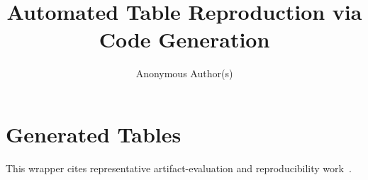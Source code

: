 \documentclass[sigconf,review,anonymous]{acmart}
\title{Automated Table Reproduction via Code Generation}
\author{Anonymous Author(s)}
\newcommand\approach{Artisan\xspace}
\begin{document}
\begin{abstract}

\end{abstract}

\maketitle

\section{Generated Tables}

This wrapper cites representative artifact-evaluation and reproducibility work~\cite{acm-artifact-badging-v1_1,DBLP:conf/sigsoft/Hermann0S20,DBLP:journals/sigsoft/Krishnamurthi13,DBLP:journals/cacm/KrishnamurthiV15,DBLP:conf/ccs/OlszewskiLSWKPU23,DBLP:journals/sigmod/AthanassoulisTA22}.
\nocite{acm-artifact-badging-v1_1,DBLP:conf/sigsoft/Hermann0S20,DBLP:journals/sigsoft/Krishnamurthi13,DBLP:journals/cacm/KrishnamurthiV15,DBLP:conf/ccs/OlszewskiLSWKPU23,DBLP:journals/sigmod/AthanassoulisTA22,reprobench,heye,super,corebench,yao2022react,DBLP:conf/icse/BouzeniaDP25,sctype,bloat,minisweagent,DBLP:conf/se/HelmRKRM25,pmsat,icse2024-ae,fse2024-ae,ase2024-ae,jimenez2024swebench,chowdhury2024swebenchverified,DBLP:journals/corr/abs-2503-15223,DBLP:conf/icse/Pan00Z0024,DBLP:journals/pacmse/Song0LCR24,sweagent,openhands,pythonic,action,npetest,interference,rust,dypybench,axa,DBLP:journals/corr/abs-2503-11926,macdiarmid2025naturalemergentmisalignmentreward,llm,bazel,lasapp,urcrat,Baker20161500SL,DBLP:journals/jmlr/PineauVSLBdFL21,DBLP:journals/corr/abs-2510-25506,DBLP:journals/pacmse/LiangBBDFF024,DBLP:conf/icml/StaraceJSACMDMK25,DBLP:journals/corr/abs-2504-17192,DBLP:journals/corr/abs-2504-00255,artifact}



\begin{table}[t]
  \small
  \centering
  \caption{Comparison of \approach{} with baselines. Success and failure numbers are sums over tasks. Cost and time are averages.}
  \label{t:baseline}
  
\end{table}

\clearpage

\noindent\begin{minipage}{\columnwidth}
  \small
  \centering
  \label{t:confusion}
  
\end{minipage}
\end{document}
